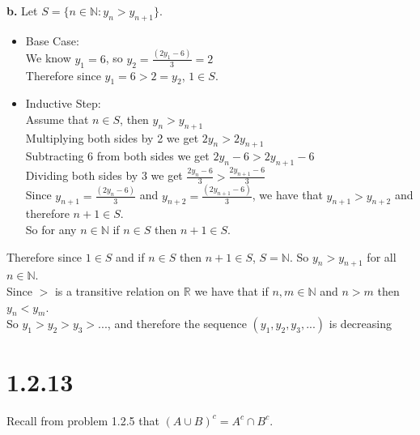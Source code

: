 \documentclass{article}
\begin{document}
{\Large \textbf{b.}} Let $S = \{n\in \mathbb{N}: y_n > y_{n+1}\}$.
\begin{center}
    \doublespacing
    \begin{itemize}
        \item Base Case:
        \\We know $y_1 = 6$, so $y_2 = \frac{(2y_1 - 6)}{3} = 2$
        \\Therefore since $y_1 = 6 > 2 = y_2$, $1\in S$.
        \item Inductive Step:
        \\Assume that $n\in S$, then $y_n > y_{n+1}$
        \\Multiplying both sides by 2 we get $2y_n > 2y_{n+1}$
        \\Subtracting 6 from both sides we get $2y_n - 6 > 2y_{n+1} - 6$
        \\Dividing both sides by 3 we get $\frac{2y_n - 6}{3} > \frac{2y_{n+1} - 6}{3}$
        \\Since $y_{n+1} = \frac{(2y_n - 6)}{3}$ and $y_{n+2} = \frac{(2y_{n+1} - 6)}{3}$, we have that $y_{n+1} > y_{n+2}$ and therefore $n+1\in S$.
        \\So for any $n\in \mathbb{N}$ if $n\in S$ then $n+1\in S$.
    \end{itemize}
    Therefore since $1\in S$ and if $n\in S$ then $n+1\in S$, $S = \mathbb{N}$. So $y_n > y_{n+1}$ for all $n\in \mathbb{N}$.
    \\Since $>$ is a transitive relation on $\mathbb{R}$ we have that if $n, m\in \mathbb{N}$ and $n > m$ then $y_n < y_m$. 
    \\So $y_1 > y_2 > y_3 > ...$, and therefore the sequence $(y_1, y_2, y_3, ...)$ is decreasing \qedsymbol
\end{center}


\newpage
\section*{1.2.13}
\begin{center}
    Recall from problem 1.2.5 that $(A\cup B)^c = A^c\cap B^c$.
\end{center}
\end{document}
